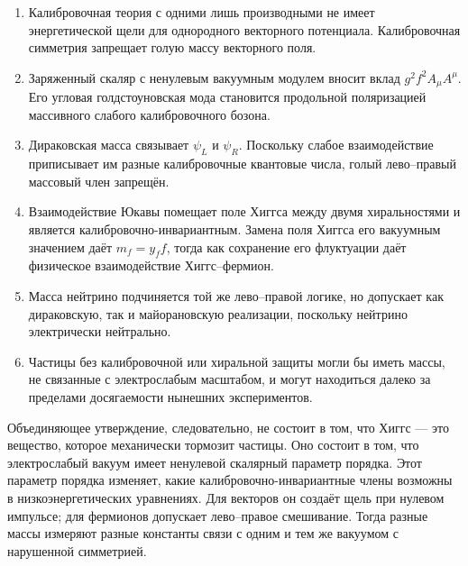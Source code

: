 \begin{enumerate}
  \item Калибровочная теория с одними лишь производными не имеет энергетической щели для однородного векторного потенциала. Калибровочная симметрия запрещает голую массу векторного поля.
  \item Заряженный скаляр с ненулевым вакуумным модулем вносит вклад \(g^2f^2A_\mu A^\mu\). Его угловая голдстоуновская мода становится продольной поляризацией массивного слабого калибровочного бозона.
  \item Дираковская масса связывает \(\psi_L\) и \(\psi_R\). Поскольку слабое взаимодействие приписывает им разные калибровочные квантовые числа, голый лево--правый массовый член запрещён.
  \item Взаимодействие Юкавы помещает поле Хиггса между двумя хиральностями и является калибровочно-инвариантным. Замена поля Хиггса его вакуумным значением даёт \(m_f=y_ff\), тогда как сохранение его флуктуации даёт физическое взаимодействие Хиггс--фермион.
  \item Масса нейтрино подчиняется той же лево--правой логике, но допускает как дираковскую, так и майорановскую реализации, поскольку нейтрино электрически нейтрально.
  \item Частицы без калибровочной или хиральной защиты могли бы иметь массы, не связанные с электрослабым масштабом, и могут находиться далеко за пределами досягаемости нынешних экспериментов.
\end{enumerate}

Объединяющее утверждение, следовательно, не состоит в том, что Хиггс — это вещество, которое механически тормозит частицы. Оно состоит в том, что электрослабый вакуум имеет ненулевой скалярный параметр порядка. Этот параметр порядка изменяет, какие калибровочно-инвариантные члены возможны в низкоэнергетических уравнениях. Для векторов он создаёт щель при нулевом импульсе; для фермионов допускает лево--правое смешивание. Тогда разные массы измеряют разные константы связи с одним и тем же вакуумом с нарушенной симметрией.